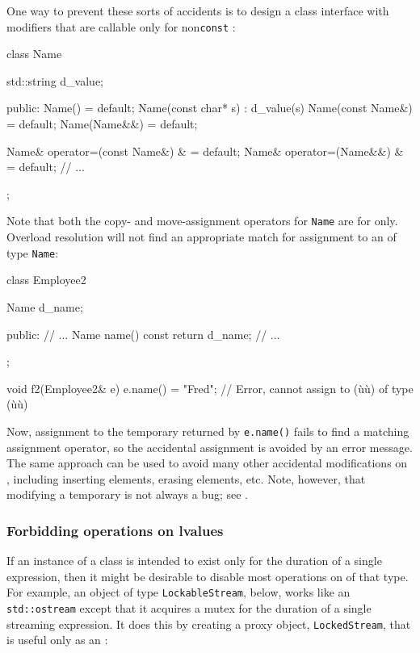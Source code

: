 One way to prevent these sorts of accidents is to design a class
interface with  modifiers that are callable only
for non\lstinline!const! :

\begin{emcppslisting}
class Name
{
    std::string d_value;

public:
    Name() = default;
    Name(const char* s) : d_value(s) {}
    Name(const Name&) = default;
    Name(Name&&) = default;

    Name& operator=(const Name&) & = default;
    Name& operator=(Name&&) &      = default;
    // ...
};
\end{emcppslisting}
    

\noindent Note that both the copy- and move-assignment operators for \lstinline!Name!
are  for  only. Overload resolution
will not find an appropriate match for assignment to an  of
type \lstinline!Name!:

\begin{emcppslisting}
class Employee2
{
    Name d_name;

public:
    // ...
    Name name() const { return d_name; }
    // ...
};

void f2(Employee2& e)
{
    e.name() = "Fred";  // Error, cannot assign to (ù{}ù) of type (ù{}ù)
}
\end{emcppslisting}
    

\noindent Now, assignment to the temporary returned by \lstinline!e.name()! fails to
find a matching assignment operator, so the accidental assignment is
avoided by an error message. The same approach can be used to avoid many
other accidental modifications on , including inserting
elements, erasing elements, etc. Note, however, that modifying a
temporary is not always a bug; see .

\subsubsection[Forbidding operations on \romeovalue{lvalues}]{Forbidding operations on {\sfbsubsubsecitalRomeo lvalues}}\label{forbidding-operations-on-lvalues}

If an instance of a class is intended to exist only for the duration of
a single expression, then it might be desirable to disable most
operations on  of that type. For example, an object of
type \lstinline!LockableStream!, below, works like an \lstinline!std::ostream!
except that it acquires a mutex for the duration of a single streaming
expression. It does this by creating a proxy object,
\lstinline!LockedStream!, that is useful only as an :

